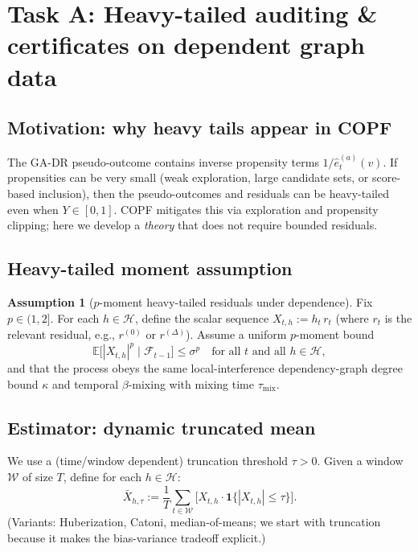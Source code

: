 \documentclass[11pt]{article}
\newcommand{\E}{\mathbb{E}}
\newcommand{\1}{\mathbf{1}}
\newcommand{\cH}{\mathcal{H}}
\newcommand{\cW}{\mathcal{W}}
\newcommand{\cF}{\mathcal{F}}
\newcommand{\abs}[1]{\left|#1\right|}
\theoremstyle{plain}
\theoremstyle{definition}
\newtheorem{assumption}[theorem]{Assumption}
\theoremstyle{remark}
\begin{document}
\section{Task A: Heavy-tailed auditing \& certificates on dependent graph data}
\label{sec:A}

\subsection{Motivation: why heavy tails appear in COPF}
The GA-DR pseudo-outcome contains inverse propensity terms $1/\hat e_t^{(a)}(v)$.
If propensities can be very small (weak exploration, large candidate sets, or score-based inclusion),
then the pseudo-outcomes and residuals can be heavy-tailed even when $Y\in[0,1]$.
COPF mitigates this via exploration and propensity clipping; here we develop a \emph{theory} that does not require bounded residuals.

\subsection{Heavy-tailed moment assumption}
\begin{assumption}[$p$-moment heavy-tailed residuals under dependence]\label{ass:heavy_resid}
Fix $p\in(1,2]$.
For each $h\in\cH$, define the scalar sequence
$X_{t,h}:=h_t\,r_t$ (where $r_t$ is the relevant residual, e.g., $r^{(0)}$ or $r^{(\Delta)}$).
Assume a uniform $p$-moment bound
\[
\E\bigl[\abs{X_{t,h}}^p \mid \cF_{t-1}\bigr]\le \sigma^p
\quad\text{for all }t\text{ and all }h\in\cH,
\]
and that the process obeys the same local-interference dependency-graph degree bound $\kappa$
and temporal $\beta$-mixing with mixing time $\tau_{\mathrm{mix}}$.
\end{assumption}

\subsection{Estimator: dynamic truncated mean}
We use a (time/window dependent) truncation threshold $\tau>0$.
Given a window $\cW$ of size $T$, define for each $h\in\cH$:
\[
\bar X_{h,\tau}:=\frac{1}{T}\sum_{t\in\cW} \bigl[X_{t,h}\cdot \1\{\abs{X_{t,h}}\le \tau\}\bigr].
\]
(Variants: Huberization, Catoni, median-of-means; we start with truncation because it makes the bias-variance tradeoff explicit.)
\end{document}
